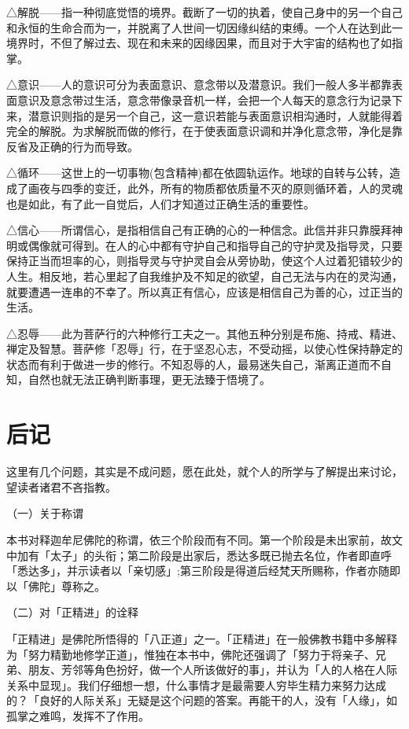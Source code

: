\documentclass[12pt,twoside,openany]{book}
\begin{document}
△解脱——指一种彻底觉悟的境界。截断了一切的执着，使自己身中的另一个自己和永恒的生命合而为一，并脱离了人世间一切因缘纠结的束缚。一个人在达到此一境界时，不但了解过去、现在和未来的因缘因果，而且对于大宇宙的结构也了如指掌。

△意识——人的意识可分为表面意识、意念带以及潜意识。我们一般人多半都靠表面意识及意念带过生活，意念带像录音机一样，会把一个人每天的意念行为记录下来，潜意识则指的是另一个自己，这一意识若能与表面意识相沟通时，人就能得着完全的解脱。为求解脱而做的修行，在于使表面意识调和并净化意念带，净化是靠反省及正确的行为而导致。

△循环——这世上的一切事物(包含精神)都在依圆轨运作。地球的自转与公转，造成了画夜与四季的变迁，此外，所有的物质都依质量不灭的原则循环着，人的灵魂也是如此，有了此一自觉后，人们才知道过正确生活的重要性。

△信心——所谓信心，是指相信自己有正确的心的一种信念。此信并非只靠膜拜神明或偶像就可得到。在人的心中都有守护自己和指导自己的守护灵及指导灵，只要保持正当而坦率的心，则指导灵与守护灵自会从旁协助，使这个人过着犯错较少的人生。相反地，若心里起了自我维护及不知足的欲望，自己无法与内在的灵沟通，就要遭遇一连串的不幸了。所以真正有信心，应该是相信自己为善的心，过正当的生活。

△忍辱——此为菩萨行的六种修行工夫之一。其他五种分别是布施、持戒、精进、禅定及智慧。菩萨修「忍辱」行，在于坚忍心志，不受动摇，以使心性保持静定的状态而有利于做进一步的修行。不知忍辱的人，最易迷失自己，渐离正道而不自知，自然也就无法正确判断事理，更无法臻于悟境了。





\chapter*{后记}

这里有几个问题，其实是不成问题，愿在此处，就个人的所学与了解提出来讨论，望读者诸君不吝指教。

（一）关于称谓

本书对释迦牟尼佛陀的称谓，依三个阶段而有不同。第一个阶段是未出家前，故文中加有「太子」的头衔；第二阶段是出家后，悉达多既已抛去名位，作者即直呼「悉达多」，并示读者以「亲切感」;第三阶段是得道后经梵天所赐称，作者亦随即以「佛陀」尊称之。

（二）对「正精进」的诠释

「正精进」是佛陀所悟得的「八正道」之一。「正精进」在一般佛教书籍中多解释为「努力精勤地修学正道」，惟独在本书中，佛陀还强调了「努力于将亲子、兄弟、朋友、芳邻等角色扮好，做一个人所该做好的事」，并认为「人的人格在人际关系中显现」。我们仔细想一想，什么事情才是最需要人穷毕生精力来努力达成的？「良好的人际关系」无疑是这个问题的答案。再能干的人，没有「人缘」，如孤掌之难鸣，发挥不了作用。
\end{document}
